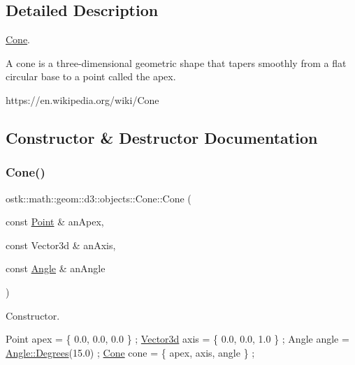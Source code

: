 \subsection{Detailed Description}
\hyperlink{classostk_1_1math_1_1geom_1_1d3_1_1objects_1_1_cone}{Cone}. 

A cone is a three-\/dimensional geometric shape that tapers smoothly from a flat circular base to a point called the apex.

https\+://en.wikipedia.\+org/wiki/\+Cone 

\subsection{Constructor \& Destructor Documentation}
\mbox{\label{classostk_1_1math_1_1geom_1_1d3_1_1objects_1_1_cone_ac86773a78cf513900e8b0d3a2709bfcb}} 
\subsubsection{\texorpdfstring{Cone()}{Cone()}}
{\footnotesize\ttfamily ostk\+::math\+::geom\+::d3\+::objects\+::\+Cone\+::\+Cone (\begin{DoxyParamCaption}\item[{const \hyperlink{classostk_1_1math_1_1geom_1_1d3_1_1objects_1_1_point}{Point} \&}]{an\+Apex,  }\item[{const Vector3d \&}]{an\+Axis,  }\item[{const \hyperlink{classostk_1_1math_1_1geom_1_1_angle}{Angle} \&}]{an\+Angle }\end{DoxyParamCaption})}



Constructor. 


\begin{DoxyCode}
Point apex = \{ 0.0, 0.0, 0.0 \} ;
\hyperlink{namespaceostk_1_1math_1_1obj_a18744cbf433bce59f6758d9fe3b1dff1}{Vector3d} axis = \{ 0.0, 0.0, 1.0 \} ;
Angle angle = \hyperlink{classostk_1_1math_1_1geom_1_1_angle_a2cefda601167af07f61f0477776203ca}{Angle::Degrees}(15.0) ;
\hyperlink{classostk_1_1math_1_1geom_1_1d3_1_1objects_1_1_cone_ac86773a78cf513900e8b0d3a2709bfcb}{Cone} cone = \{ apex, axis, angle \} ;
\end{DoxyCode}



